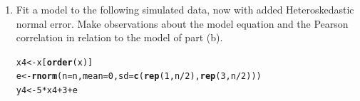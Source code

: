 \documentclass{article}\usepackage[]{graphicx}\usepackage[]{color}
\makeatletter
\newcommand{\hlnum}[1]{\textcolor[rgb]{0.686,0.059,0.569}{#1}}%
\newcommand{\hlopt}[1]{\textcolor[rgb]{0,0,0}{#1}}%
\newcommand{\hlstd}[1]{\textcolor[rgb]{0.345,0.345,0.345}{#1}}%
\newcommand{\hlkwb}[1]{\textcolor[rgb]{0.69,0.353,0.396}{#1}}%
\newcommand{\hlkwc}[1]{\textcolor[rgb]{0.333,0.667,0.333}{#1}}%
\newcommand{\hlkwd}[1]{\textcolor[rgb]{0.737,0.353,0.396}{\textbf{#1}}}%
\newenvironment{kframe}{%
 \def\at@end@of@kframe{}%
 \ifinner\ifhmode%
  \def\at@end@of@kframe{\end{minipage}}%
  \begin{minipage}{\columnwidth}%
 \fi\fi%
 \def\FrameCommand##1{\hskip\@totalleftmargin \hskip-\fboxsep
 \colorbox{shadecolor}{##1}\hskip-\fboxsep
     \hskip-\linewidth \hskip-\@totalleftmargin \hskip\columnwidth}%
 \MakeFramed {\advance\hsize-\width
   \@totalleftmargin\z@ \linewidth\hsize
   \@setminipage}}%
 {\par\unskip\endMakeFramed%
 \at@end@of@kframe}
\newenvironment{knitrout}{}{} %
\makeatother
\begin{document}
\begin{enumerate}
\begin{enumerate}
\item Fit a model to the following simulated data, now with added Heteroskedastic
normal error. Make observations about the model equation and the Pearson correlation
in relation to the model of part (b).
\begin{knitrout}
\color{fgcolor}\begin{kframe}
\begin{alltt}
\hlstd{x4}\hlkwb{<-}\hlstd{x[}\hlkwd{order}\hlstd{(x)]}
\hlstd{e}\hlkwb{<-}\hlkwd{rnorm}\hlstd{(}\hlkwc{n}\hlstd{=n,}\hlkwc{mean}\hlstd{=}\hlnum{0}\hlstd{,}\hlkwc{sd}\hlstd{=}\hlkwd{c}\hlstd{(}\hlkwd{rep}\hlstd{(}\hlnum{1}\hlstd{,n}\hlopt{/}\hlnum{2}\hlstd{),}\hlkwd{rep}\hlstd{(}\hlnum{3}\hlstd{,n}\hlopt{/}\hlnum{2}\hlstd{)))}
\hlstd{y4}\hlkwb{<-}\hlnum{5}\hlopt{*}\hlstd{x4} \hlopt{+} \hlnum{3} \hlopt{+} \hlstd{e}
\end{alltt}
\end{kframe}
\end{knitrout}


\end{enumerate}
\end{enumerate}
\end{document}
